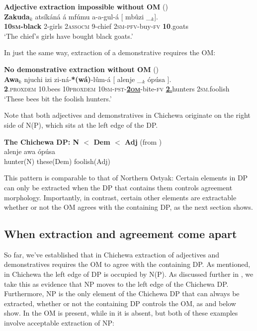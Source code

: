 \documentclass[output=paper,colorlinks,citecolor=brown]{langscibook}
\begin{document}
\ea%
    \label{ex:branan:6}
    \textbf{Adjective extraction impossible without OM}  \hfill{(\citealt[ex. 4a]{Mchombo2006})}\\
    \gll    *\textbf{Zakuda}$_{k}$ ats\'{i}k\'{a}n\'{a} \'{a} mf\'{u}mu a-a-gul-\'{a} [ mb\^{u}zi   \_$_{k}$].   \\
            \hphantom{*}\textbf{10\textsc{sm}-black} 2-girls 2\textsc{assocm} 9-chief 2\textsc{sm-pfv}-buy-\textsc{fv} {} \textbf{10}.goats {} \\
    \glt    `The chief's girls have bought black goats.'
\z

In just the same way, extraction of a demonstrative requires the OM:

\ea%
    \label{ex:branan:7}
    \textbf{No demonstrative extraction without OM} \hfill{(\citealt[ex. 2b-c]{Mchombo2006})}\\
    \gll    \textbf{Awa}$_{k}$ njuchi izi zi-n\'{a}-\textbf{*(w\'{a})}-l\^{u}m-\'{a} [ alenje \_$_{k}$ \'{o}p\'{u}sa  ]. \\
            \textbf{2}.\textsc{proxdem} 10.bees 10\textsc{proxdem} 10\textsc{sm-pst}-\underline{\textbf{2\textsc{om}}}-bite-\textsc{fv} {} \underline{\textbf{2.}}hunters {} 2\textsc{sm}.foolish {} \\
    \glt    `These bees bit the foolish hunters.'
\z

Note that both adjectives and demonstratives in Chichewa originate on the right side of N(P), which sits at the left edge of the DP.

\ea%
    \label{ex:branan:8}
    \textbf{The Chichewa DP: N $<$ Dem $<$ Adj}  \hfill{(from \citealt[ex. 2a]{Mchombo2006})}\\
    \gll    alenje awa \'{o}p\'{u}sa \\
            hunter(N) these(Dem) foolish(Adj) \\
\z

This pattern is comparable to that of Northern Ostyak: Certain elements in DP can only be extracted when the DP that contains them controls agreement morphology. Importantly, in contrast, certain other elements are extractable whether or not the OM agrees with the containing DP, as the next section shows.

\subsection{When extraction and agreement come apart}\label{sec:branan:3.2}

So far, we've established that in Chichewa extraction of adjectives and demonstratives requires the OM to agree with the containing DP. As mentioned, in Chichewa the left edge of DP is occupied by N(P). As discussed further in , we take this as evidence that NP moves to the left edge of the Chichewa DP. Furthermore, NP is the only element of the Chichewa DP that can always be extracted, whether or not the containing DP controls the OM, as  and  below show. In  the OM is present, while in  it is absent, but both of these examples involve acceptable extraction of NP:
\end{document}
